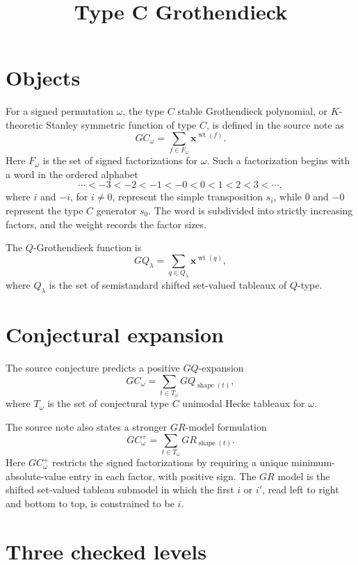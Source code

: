 \documentclass{article}
\title{Type C Grothendieck}
\author{}
\date{}
\begin{document}
\maketitle

\section{Objects}

For a signed permutation \(\omega\), the type \(C\) stable Grothendieck
polynomial, or \(K\)-theoretic Stanley symmetric function of type \(C\), is
defined in the source note as
\[
  GC_\omega=\sum_{f\in F_\omega} \mathbf{x}^{\operatorname{wt}(f)}.
\]
Here \(F_\omega\) is the set of signed factorizations for \(\omega\).  Such a
factorization begins with a word in the ordered alphabet
\[
  \cdots < -3 < -2 < -1 < -0 < 0 < 1 < 2 < 3 < \cdots,
\]
where \(i\) and \(-i\), for \(i\ne 0\), represent the simple transposition
\(s_i\), while \(0\) and \(-0\) represent the type \(C\) generator \(s_0\).  The
word is subdivided into strictly increasing factors, and the weight records the
factor sizes.

The \(Q\)-Grothendieck function is
\[
  GQ_\lambda=\sum_{q\in Q_\lambda}\mathbf{x}^{\operatorname{wt}(q)},
\]
where \(Q_\lambda\) is the set of semistandard shifted set-valued tableaux of
\(Q\)-type.

\section{Conjectural expansion}

The source conjecture predicts a positive \(GQ\)-expansion
\[
  GC_\omega = \sum_{t\in T_\omega} GQ_{\operatorname{shape}(t)},
\]
where \(T_\omega\) is the set of conjectural type \(C\) unimodal Hecke tableaux
for \(\omega\).

The source note also states a stronger \(GR\)-model formulation
\[
  GC_\omega^+ = \sum_{t\in T_\omega} GR_{\operatorname{shape}(t)}.
\]
Here \(GC_\omega^+\) restricts the signed factorizations by requiring a unique
minimum-absolute-value entry in each factor, with positive sign.  The \(GR\)
model is the shifted set-valued tableau submodel in which the first \(i\) or
\(i'\), read left to right and bottom to top, is constrained to be \(i\).

\section{Three checked levels}
\end{document}
